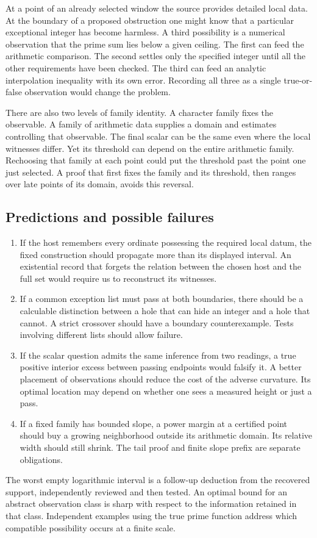 \documentclass[12pt,letterpaper]{article}
\begin{document}
At a point of an already selected window the source provides detailed local data. At the boundary of a proposed obstruction one might know that a particular exceptional integer has become harmless. A third possibility is a numerical observation that the prime sum lies below a given ceiling. The first can feed the arithmetic comparison. The second settles only the specified integer until all the other requirements have been checked. The third can feed an analytic interpolation inequality with its own error. Recording all three as a single true-or-false observation would change the problem.

There are also two levels of family identity. A character family fixes the observable. A family of arithmetic data supplies a domain and estimates controlling that observable. The final scalar can be the same even where the local witnesses differ. Yet its threshold can depend on the entire arithmetic family. Rechoosing that family at each point could put the threshold past the point one just selected. A proof that first fixes the family and its threshold, then ranges over late points of its domain, avoids this reversal.

\subsection{Predictions and possible failures}
\begin{enumerate}
\item If the host remembers every ordinate possessing the required local datum, the fixed construction should propagate more than its displayed interval. An existential record that forgets the relation between the chosen host and the full set would require us to reconstruct its witnesses.
\item If a common exception list must pass at both boundaries, there should be a calculable distinction between a hole that can hide an integer and a hole that cannot. A strict crossover should have a boundary counterexample. Tests involving different lists should allow failure.
\item If the scalar question admits the same inference from two readings, a true positive interior excess between passing endpoints would falsify it. A better placement of observations should reduce the cost of the adverse curvature. Its optimal location may depend on whether one sees a measured height or just a pass.
\item If a fixed family has bounded slope, a power margin at a certified point should buy a growing neighborhood outside its arithmetic domain. Its relative width should still shrink. The tail proof and finite slope prefix are separate obligations.
\end{enumerate}
The worst empty logarithmic interval is a follow-up deduction from the recovered support, independently reviewed and then tested. An optimal bound for an abstract observation class is sharp with respect to the information retained in that class. Independent examples using the true prime function address which compatible possibility occurs at a finite scale.
\end{document}
